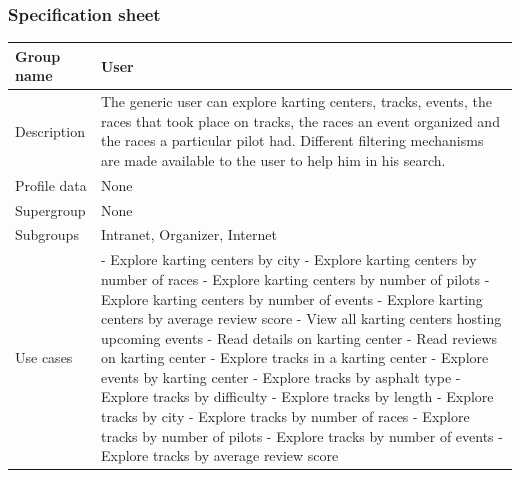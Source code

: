 \documentclass{beamer}
\begin{document}
\begin{frame}
    \frametitle{Specification sheet}
    \begin{table}
        \tiny
        \begin{tabular}{|p{2cm}|p{6cm}|}
        \hline
        Group name & \textbf{User} \\
        \hline
        Description & The generic user can explore karting centers, tracks, events, the races that
        took place on tracks, the races an event organized and the races a particular pilot had.
        Different filtering mechanisms are made available to the user to help him in his search. \\
        \hline
        Profile data & None \\
        \hline
        Supergroup & None \\
        \hline
        Subgroups & Intranet, Organizer, Internet\\
        \hline
        Use cases &
        - Explore karting centers by city \newline
        - Explore karting centers by number of races \newline
        - Explore karting centers by number of pilots \newline
        - Explore karting centers by number of events \newline
        - Explore karting centers by average review score \newline
        - View all karting centers hosting upcoming events \newline
        - Read details on karting center \newline
        - Read reviews on karting center \newline
        - Explore tracks in a karting center \newline
        - Explore events by karting center \newline
        - Explore tracks by asphalt type \newline
        - Explore tracks by difficulty \newline
        - Explore tracks by length \newline
        - Explore tracks by city \newline
        - Explore tracks by number of races \newline
        - Explore tracks by number of pilots \newline
        - Explore tracks by number of events \newline
        - Explore tracks by average review score \\
        \hline
        \end{tabular}
    \end{table}
\end{frame}
\end{document}
